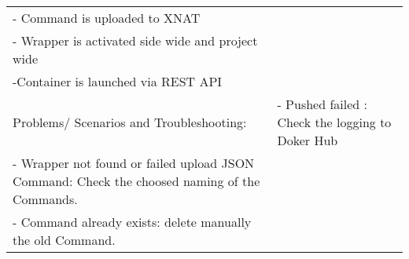 \begin{center}
\begin{tabular}{|l>{\justify}p{5cm}|}
                                 - Command is uploaded to XNAT\\
                                 - Wrapper is activated side wide and project wide\\
                                 -Container is launched via REST API
                                 \tabularnewline
\hline
Problems/ Scenarios and Troubleshooting:  & - Pushed failed : Check the logging to Doker Hub\\
                        - Wrapper not found or failed upload JSON Command: Check the choosed naming of the Commands.\\
                        - Command already exists: delete manually the old Command. 
      \tabularnewline

      
\hline
\end{tabular}
\end{center}
